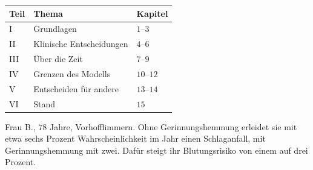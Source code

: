 \begin{merksatz}
\begin{center}
{\small
\renewcommand{\arraystretch}{1.5}
\begin{tabular}{@{}P{1.4cm}P{3.6cm}P{3.0cm}@{}}
\toprule
\textbf{Teil} & \textbf{Thema} & \textbf{Kapitel}\\
\midrule
I & Grundlagen & $1$--$3$\\
II & Klinische Entscheidungen & $4$--$6$\\
III & Über die Zeit & $7$--$9$\\
IV & Grenzen des Modells & $10$--$12$\\
V & Entscheiden für andere & $13$--$14$\\
VI & Stand & $15$\\
\bottomrule
\end{tabular}}
\end{center}

Frau B., $78$ Jahre, Vorhofflimmern. Ohne Gerinnungshemmung erleidet sie mit etwa sechs Prozent Wahrscheinlichkeit im Jahr einen Schlaganfall, mit Gerinnungshemmung mit zwei. Dafür steigt ihr Blutungsrisiko von einem auf drei Prozent.

\begin{center}
\begin{minipage}{0.88\textwidth}
\end{minipage}
\end{center}
\end{merksatz}

